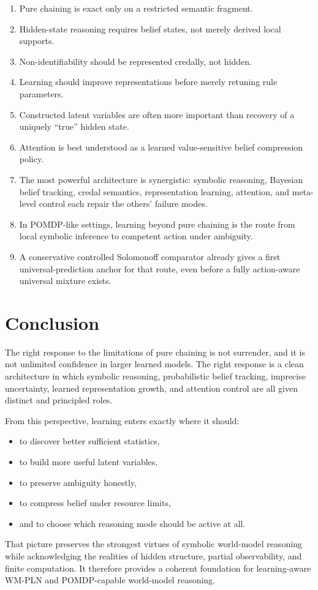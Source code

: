\documentclass[11pt]{article}
\newcommand{\wmpln}{WM-PLN}
\begin{document}
\begin{enumerate}
  \item Pure chaining is exact only on a restricted semantic fragment.
  \item Hidden-state reasoning requires belief states, not merely derived local
        supports.
  \item Non-identifiability should be represented credally, not hidden.
  \item Learning should improve representations before merely retuning rule
        parameters.
  \item Constructed latent variables are often more important than recovery of a
        uniquely ``true'' hidden state.
  \item Attention is best understood as a learned value-sensitive belief
        compression policy.
  \item The most powerful architecture is synergistic: symbolic reasoning,
        Bayesian belief tracking, credal semantics, representation learning,
        attention, and meta-level control each repair the others' failure modes.
  \item In POMDP-like settings, learning beyond pure chaining is the route from
        local symbolic inference to competent action under ambiguity.
  \item A conservative controlled Solomonoff comparator already gives a first
        universal-prediction anchor for that route, even before a fully
        action-aware universal mixture exists.
\end{enumerate}

\section{Conclusion}

The right response to the limitations of pure chaining is not surrender, and it
is not unlimited confidence in larger learned models.  The right response is a
clean architecture in which symbolic reasoning, probabilistic belief tracking,
imprecise uncertainty, learned representation growth, and attention control are
all given distinct and principled roles.

From this perspective, learning enters exactly where it should:
\begin{itemize}
  \item to discover better sufficient statistics,
  \item to build more useful latent variables,
  \item to preserve ambiguity honestly,
  \item to compress belief under resource limits,
  \item and to choose which reasoning mode should be active at all.
\end{itemize}

That picture preserves the strongest virtues of symbolic world-model reasoning
while acknowledging the realities of hidden structure, partial observability,
and finite computation.  It therefore provides a coherent foundation for
learning-aware \wmpln{} and POMDP-capable world-model reasoning.
\end{document}
